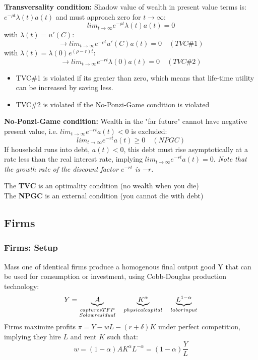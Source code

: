 \textbf{Transversality condition:} Shadow value of wealth in present value terms is: $e^{-\rho t}\lambda(t)a(t)$ and must approach zero for $t\rightarrow \infty:$
$$lim_{t\rightarrow\infty}e^{-\rho t}\lambda(t)a(t)=0$$ 
with $\lambda(t)=u'(C)$:
$$\longrightarrow  lim_{t\rightarrow\infty}e^{-\rho t}u'(C)a(t)=0 \quad (TVC\#1)$$ 
with $\lambda(t)=\lambda(0)e^{(\rho-r)t} $:
$$\longrightarrow lim_{t\rightarrow\infty}e^{-r t}\lambda(0)a(t)=0 \quad (TVC\#2)$$
\begin{itemize}
    \item TVC\#1 is violated if its greater than zero, which means that life-time utility can be increased by saving less.
    \item TVC\#2 is violated if the No-Ponzi-Game condition is violated
\end{itemize}
\textbf{No-Ponzi-Game condition:} Wealth in the "far future" cannot have negative present value, i.e. $lim_{t\rightarrow\infty}e^{-rt}a(t)<0$ is excluded:
$$lim_{t\rightarrow\infty}e^{-rt}a(t)\geq0 \quad (NPGC)$$
If household runs into debt, $a(t)<0$, this debt must rise asymptotically at a rate less than the real interest rate, implying $lim_{t\rightarrow\infty}e^{-rt}a(t)=0$. \textit{Note that the growth rate of the discount factor $e^{-rt}$ is $-r$}.
\begin{tcolorbox}[
    colback=blue!5!white, %
    colframe=blue!40!white, %
    title=Difference between TVC and NPGC, %
    fonttitle=\bfseries %
    ]

The \textbf{TVC} is an optimality condition (no wealth when you die) \\

The \textbf{NPGC} is an external condition (you cannot die with debt) 
\end{tcolorbox}



\subsection{Firms}
\subsubsection{Firms: Setup}
Mass one of identical firms produce a homogenous final output good Y that can be used for consumption or investment, using Cobb-Douglas production technology:
$$Y=\underbrace{A}_{\substack{captures\space TFP \\ Solow\space residual}}\quad \underbrace{K^\alpha}_{\substack{physical \space capital}}\quad \underbrace{L^{1-\alpha}}_{\substack{labor\space input}}$$
Firms maximize profits $\pi=Y-wL-(r+\delta)K$ under perfect competition, implying they hire $L$ and rent $K$ such that: 
\begin{equation}
w = (1 - \alpha) A K^{\alpha} L^{-\alpha} = (1 - \alpha) \frac{Y}{L}
\end{equation}

